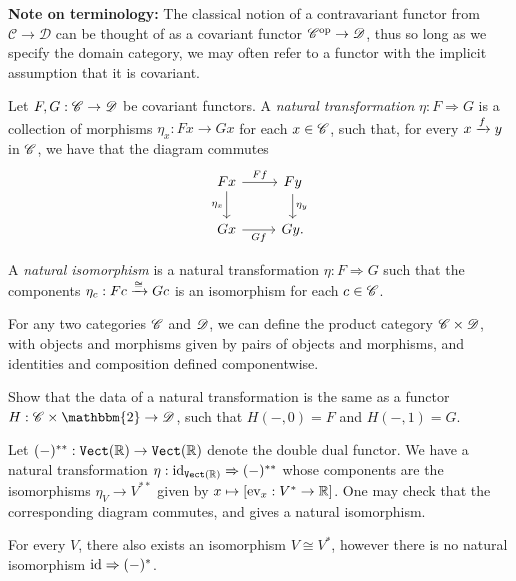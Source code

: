 \documentclass{article}[11pt]
\begin{document}
{\bf Note on terminology:} The classical notion of a contravariant functor from $\mathscr{C}\to\mathscr{D}$ can be thought of as a covariant functor $\mathscr{C}^{\text{op}} \to \mathscr{D}$, thus so long as we specify the domain category, we may often refer to a functor with the implicit assumption that it is covariant.



\begin{definition} Let $F,G : \mathscr{C} \to \mathscr{D}$ be covariant functors. A \textit{natural transformation} $\eta : F \Rightarrow G$ is a collection of morphisms $\eta_x : Fx \to Gx$ for each $x\in \mathscr{C}$, such that, for every $x\xrightarrow{f} y$ in $\mathscr{C}$, we have that the diagram commutes
\[
	\begin{tikzcd}
	Fx\rar["Ff" above]\dar["\eta_x" left] & Fy\dar["\eta_y" right] \\
	Gx\rar["Gf" below] & Gy.
	\end{tikzcd}
\]
\end{definition}

\begin{definition} A \textit{natural isomorphism} is a natural transformation $\eta: F \Rightarrow G$ such that the components $\eta_c : Fc \xrightarrow{\cong} Gc$ is an isomorphism for each $c\in \mathscr{C}$.
\end{definition}


For any two categories $\mathscr{C}$ and $\mathscr{D}$, we can define the product category $\mathscr{C}\times \mathscr{D}$, with objects and morphisms given by pairs of objects and morphisms, and identities and composition defined componentwise. 

\begin{exercise} Show that the data of a natural transformation is the same as a functor $H : \C\times\mathbbm{2} \to \D$, such that $H(-,0)=F$ and $H(-,1) = G$. 
\end{exercise}


\begin{example} Let $(-)^{\ast\ast} : \texttt{Vect}(\mathbb{R}) \to \texttt{Vect}(\mathbb{R})$ denote the double dual functor. We have a natural transformation $\eta : \text{id}_{\texttt{Vect}(\mathbb{R})} \Rightarrow (-)^{\ast\ast}$ whose components are the isomorphisms $\eta_V \to V^{\ast\ast}$ given by $x\mapsto [\text{ev}_x : V^\ast \to \mathbb{R}]$. One may check that the corresponding diagram commutes, and gives a natural isomorphism.
\end{example}


\begin{remark} For every $V$, there also exists an isomorphism $V\cong V^\ast$, however there is no natural isomorphism $\text{id} \Rightarrow (-)^\ast$.
\end{remark}
\end{document}
